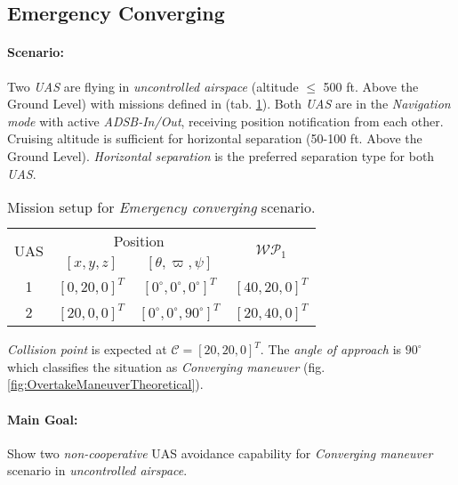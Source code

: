 \subsection{Emergency Converging}\label{s:testEmergencyConverging}

\paragraph{Scenario:} Two \emph{UAS} are flying in  \emph{uncontrolled airspace} (altitude $\le$ 500 ft. Above the Ground Level) with missions defined in (tab. \ref{tab:missionSetupEmergencyConvergingScenario}). Both \emph{UAS} are in the \emph{Navigation mode} with active \emph{ADSB-In/Out}, receiving position notification from each other. Cruising altitude is sufficient for horizontal separation (50-100 ft. Above the Ground Level). \emph{Horizontal separation} is the preferred separation type for both \emph{UAS}.

\begin{table}[H]
    \centering
    \begin{tabular}{c||c|c||c}
        \multirow{2}{*}{UAS} &\multicolumn{2}{c||}{Position} & \multirow{2}{*}{$\mathscr{WP}_1$} \\\cline{2-3}
          & $[x,y,z]$           & $[\theta,\varpi,\psi]$           & \\\hline\hline
        1 & $[0,20,0]^T $       & $[0^\circ,0^\circ,0^\circ]^T$    & $[40,20,0]^T$\\\hline 
        2 & $[20,0,0]^T $       & $[0^\circ,0^\circ,90^\circ]^T$  & $[20,40,0]^T$\\ 
    \end{tabular}
    \caption{Mission setup for \emph{Emergency converging} scenario.}
    \label{tab:missionSetupEmergencyConvergingScenario}
\end{table}

\begin{note}
\emph{Collision point} is expected at $\mathscr{C} = [20,20,0]^T$. The \emph{angle of approach} is $90^{\circ}$ which classifies the  situation as \emph{Converging maneuver} (fig. \ref{fig:OvertakeManeuverTheoretical}).
\end{note}

\paragraph{Main Goal:} Show two \emph{non-cooperative} UAS avoidance capability for \emph{Converging maneuver} scenario in \emph{uncontrolled airspace}.


